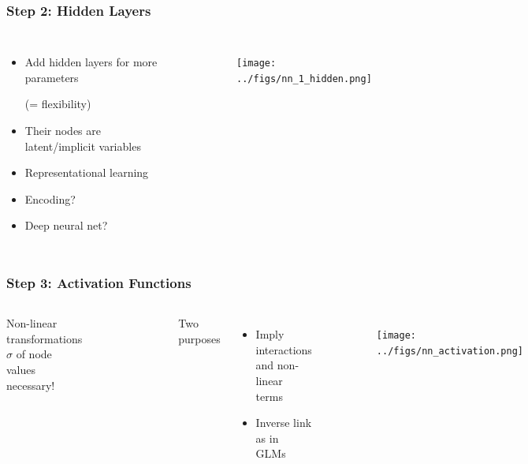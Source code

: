 \documentclass[
    utf8,
    aspectratio=169
]{beamer}  %
\begin{document}
\begin{frame}
\frametitle{Step 2: Hidden Layers}
\begin{columns}
	\begin{itemize}
		\item Add \alert{hidden layers} for more parameters 
		
		(= flexibility)
		\item Their nodes are latent/implicit variables
		\item Representational learning
		\item \small{\alert{Encoding}?}
		\item \small{\alert{Deep} neural net?}
	\end{itemize}
	\begin{example}
	\end{example}
	\begin{figure}
		\texttt{[image: ../figs/nn\_1\_hidden.png]}
	\end{figure}
\end{columns}
\end{frame}

\begin{frame}
\frametitle{Step 3: Activation Functions}
\begin{columns}
	Non-linear transformations $\sigma$ of node values necessary!
		\begin{figure}
		\includegraphics[width=0.98\textwidth]{pics/activation_functions.png}
	\end{figure}
	Two purposes
	\begin{itemize}
		\item Imply interactions and non-linear terms
		\item Inverse link as in GLMs
	\end{itemize}
	\begin{example}
	\end{example}
	\begin{figure}
		\texttt{[image: ../figs/nn\_activation.png]}
	\end{figure}
\end{columns}
\end{frame}
\end{document}
